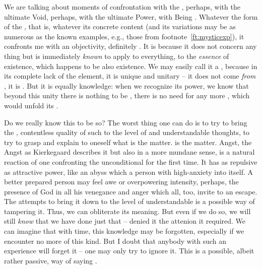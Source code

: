 
We are talking about moments of confrontation with the , perhaps, with the ultimate Void, perhaps, with the
ultimate Power, with Being .  Whatever
the form of the , that is, whatever its concrete
content (and its variations may be as numerous as the known examples,
e.g., those from footnote~\ref{ft:mysticexp}), it confronts me with an
 objectivity, definitely .  It is
 because it does not concern any thing but is immediately
{\em known} to apply to everything, to the {\em essence} of existence,
which happens to be also  existence.  We may easily call it a
, because in its complete lack of the 
element, it is unique and unitary -- it does not come {\em from}
, it is .  But it is equally knowledge: when we
recognize its  power, we know that beyond this unity
there is nothing to be , there is no need for any
more , which would unfold its .

\subpa Do we really know this to be so?  The worst thing one can do is
to try to bring the , contentless quality of such
 to the level of  and understandable
thoughts, to try to grasp and explain to oneself what is the matter. 
 is the matter. 
Angst, the Angst as Kierkegaard describes it but also in a more 
mundane sense, is a natural reaction of
one confronting the unconditional for the first time.  It has as 
repulsive as attractive power, like an abyss which  a 
person with high-anxiety into itself. 
A better
prepared person may feel awe or overpowering intensity, perhaps, the
presence of God in all his venegance and anger which all, too, invite
to an escape.  The attempts to bring it down to the level of
 understandable is a possible way of tampering it.  Thus,
we can obliterate its meaning.  But even if we do so, we will still
{\em know} that we have done just that -- denied it the attenion it
required.  We can imagine that with time, this knowledge may be
forgotten, especially if we encounter no more  of this
kind.  But I doubt that anybody with such an experience will forget it
-- one may only try to ignore it.  This is a possible, albeit rather
passive, way of saying \No.

